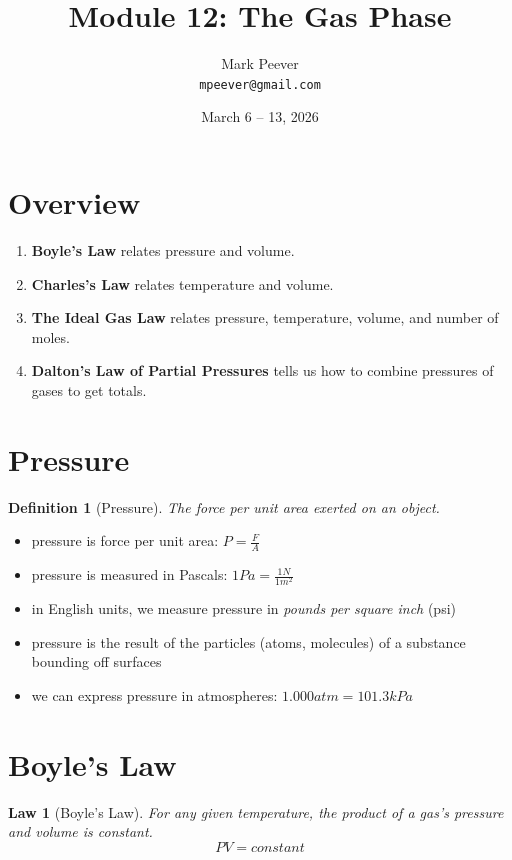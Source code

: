\documentclass[11pt, oneside]{article}   	%
\title{Module 12: The Gas Phase}
\author{Mark Peever\\ \texttt{mpeever@gmail.com}}
\date{March 6 -- 13, 2026}
\newtheorem{definition}{Definition}
\newtheorem{law}{Law}
\begin{document}
\maketitle

\section{Overview}
\begin{enumerate}
\item \textbf{Boyle's Law} relates pressure and volume.
\item \textbf{Charles's Law} relates temperature and volume.
\item \textbf{The Ideal Gas Law} relates pressure, temperature, volume, and number of moles.
\item \textbf{Dalton's Law of Partial Pressures} tells us how to combine pressures of gases to get totals.
\end{enumerate}

\section{Pressure}

\begin{definition}[Pressure]\label{def:pressure}
The force per unit area exerted on an object.\\
\end{definition}


\begin{itemize}
\item pressure is force per unit area: $P = \frac{F}{A}$
\item pressure is measured in Pascals: $1 Pa = \frac{1 N}{1 m^{2}}$
\item in English units, we measure pressure in \emph{pounds per square inch} (psi)
\item pressure is the result of the particles (atoms, molecules) of a substance bounding off surfaces
\item we can express pressure in atmospheres: $1.000 atm = 101.3 kPa$
\end{itemize}

\section{Boyle's Law}

\begin{law}[Boyle's Law]\label{law:boyles}
For any given temperature, the product of a gas's pressure and volume is constant.\\
$$P V = constant$$
\end{law}
\end{document}
